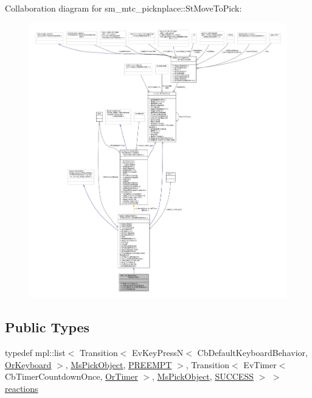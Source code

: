 Collaboration diagram for sm\+\_\+mtc\+\_\+picknplace\+:\+:St\+Move\+To\+Pick\+:
\nopagebreak
\begin{figure}[H]
\begin{center}
\leavevmode
\includegraphics[width=350pt]{structsm__mtc__picknplace_1_1StMoveToPick__coll__graph}
\end{center}
\end{figure}
\subsection*{Public Types}
\begin{DoxyCompactItemize}
\item 
typedef mpl\+::list$<$ Transition$<$ Ev\+Key\+PressN$<$ Cb\+Default\+Keyboard\+Behavior, \hyperlink{classsm__mtc__picknplace_1_1OrKeyboard}{Or\+Keyboard} $>$, \hyperlink{classsm__mtc__picknplace_1_1MsPickObject}{Ms\+Pick\+Object}, \hyperlink{classPREEMPT}{P\+R\+E\+E\+M\+PT} $>$, Transition$<$ Ev\+Timer$<$ Cb\+Timer\+Countdown\+Once, \hyperlink{classsm__mtc__picknplace_1_1OrTimer}{Or\+Timer} $>$, \hyperlink{classsm__mtc__picknplace_1_1MsPickObject}{Ms\+Pick\+Object}, \hyperlink{classSUCCESS}{S\+U\+C\+C\+E\+SS} $>$ $>$ \hyperlink{structsm__mtc__picknplace_1_1StMoveToPick_a959271af5d1a2713f1342b3cdbc99f83}{reactions}
\end{DoxyCompactItemize}
